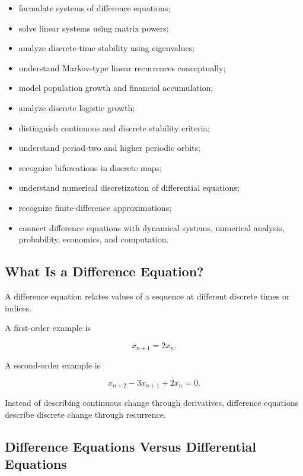 {\begin{itemize}
    \item formulate systems of difference equations;
    \item solve linear systems using matrix powers;
    \item analyze discrete-time stability using eigenvalues;
    \item understand Markov-type linear recurrences conceptually;
    \item model population growth and financial accumulation;
    \item analyze discrete logistic growth;
    \item distinguish continuous and discrete stability criteria;
    \item understand period-two and higher periodic orbits;
    \item recognize bifurcations in discrete maps;
    \item understand numerical discretization of differential equations;
    \item recognize finite-difference approximations;
    \item connect difference equations with dynamical systems,
          numerical analysis, probability, economics, and computation.
\end{itemize}
}

\subsection{What Is a Difference Equation?}
\label{subsec:what-is-difference-equation}

A difference equation relates values of a sequence at different discrete
times or indices.

A first-order example is

\[
\boxed{
x_{n+1}=2x_n.
}
\]

A second-order example is

\[
\boxed{
x_{n+2}-3x_{n+1}+2x_n=0.
}
\]

Instead of describing continuous change through derivatives, difference
equations describe discrete change through recurrence.

\subsection{Difference Equations Versus Differential Equations}
\label{subsec:difference-versus-differential}


